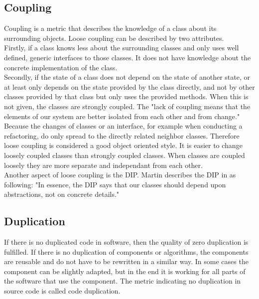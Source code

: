 \subsection*{Coupling}
\label{coupling}
Coupling is a metric that describes the knowledge of a class about its surrounding objects. Loose coupling can be described by two attributes. 
\\

Firstly, if a class knows less about the surrounding classes and only uses well defined, generic interfaces to those classes. It does not have knowledge about the concrete implementation of the class. 
\\

Secondly, if the state of a class does not depend on the state of another state, or at least only depends on the state provided by the class directly, and not by other classes provided by that class but only uses the provided methods. 
When this is not given, the classes are strongly coupled. The "lack of coupling means that the elements of our system are better isolated from each other and from change." \cite[Loose Coupling]{wiki}
Because the changes of classes or an interface, for example when conducting a refactoring, do only spread to the directly related neighbor classes. Therefore loose coupling is considered a good object oriented style. It is easier to change loosely coupled classes than strongly coupled classes. When classes are coupled loosely they are more separate and independant from each other. 
\\

Another aspect of loose coupling is the \ac{DIP}. 
Martin describes the \ac{DIP} in \cite{cc} as following: "In essence, the DIP says that our classes should depend upon abstractions, not on concrete details." \cite{cc}

\subsection*{Duplication}
\label{duplication}
If there is no duplicated code in software, then the quality of zero duplication is fulfilled. If there is no duplication of components or algorithms, the components are reusable and do not have to be rewritten in a similar way. In some cases the component can be slightly adapted, but in the end it is working for all parts of the software that use the component. 
The metric indicating no duplication in source code is called code duplication. 

